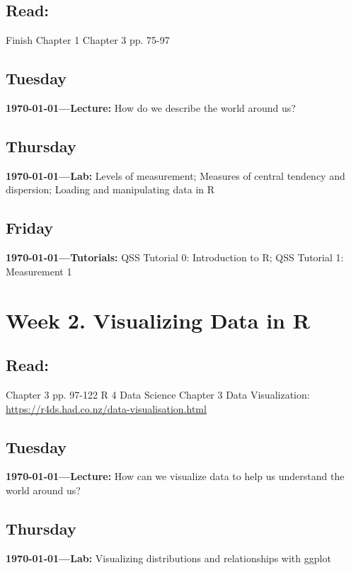\subsection{Read:}

\citet{Imai2022-pm} Finish Chapter 1 
\citet{Imai2022-pm} Chapter 3 pp. 75-97 


\subsection{Tuesday} \textbf{\today---Lecture:} How do we describe the world around us?
\AdvanceDate[2]

\subsection{Thursday} \textbf{\today---Lab:} Levels of measurement; Measures of central tendency and dispersion; Loading and manipulating data in R
\AdvanceDate[1]
\subsection{Friday} \textbf{\today---Tutorials:} 
QSS Tutorial 0: Introduction to R; QSS Tutorial 1: Measurement 1
\AdvanceDate[4]



\vspace{2em}


\section{Week 2. Visualizing Data in R}

\subsection{Read:}

\citet{Imai2022-pm} Chapter 3 pp. 97-122
R 4 Data Science Chapter 3 Data Visualization: \url{https://r4ds.had.co.nz/data-visualisation.html}


\subsection{Tuesday} \textbf{\today---Lecture:} How can we visualize data to help us understand the world around us?
\AdvanceDate[2]

\subsection{Thursday} \textbf{\today---Lab:} Visualizing distributions and relationships with ggplot
\AdvanceDate[1]
